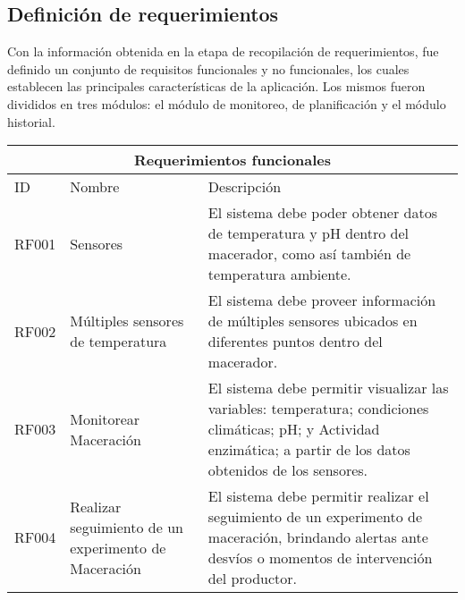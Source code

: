     \subsection{Definición de requerimientos}
    \begin{minipage}{0.95\textwidth}
    \par
    Con la información obtenida en la etapa de recopilación de requerimientos, fue definido un conjunto de requisitos funcionales y no funcionales, los cuales establecen las principales características de la aplicación. Los mismos fueron divididos en tres módulos: el módulo de monitoreo, de planificación y el módulo historial.
    \end{minipage}
    
  \begin{minipage}{0.95\textwidth}
   \begin{center}
   \begin{tabularx}{\textwidth}{| X | X | X |}
   \hline
   \multicolumn{3}{|c|}{\textbf{Requerimientos funcionales}} \\
   \hline
    ID & Nombre & Descripción \\
   \hline
   \hline
        RF001 & Sensores & El sistema debe poder obtener datos de temperatura y pH dentro del macerador, como así también de temperatura ambiente.
        \\\hline
        RF002 & Múltiples sensores de temperatura  & El sistema debe proveer información de múltiples sensores ubicados en diferentes puntos dentro del macerador.
        \\\hline
        RF003 & Monitorear Maceración & El sistema debe permitir visualizar las variables: temperatura; condiciones climáticas; pH; y Actividad enzimática; a partir de los datos obtenidos de los sensores.
        \\\hline
        RF004 & Realizar seguimiento de un experimento de Maceración & El sistema debe permitir realizar el seguimiento de un experimento de maceración, brindando alertas ante desvíos o momentos de intervención del productor. \\\hline
        
    \end{tabularx}
    \label{ReqFuncionales_Parte1}
    \end{center}
    \end{minipage}
    

